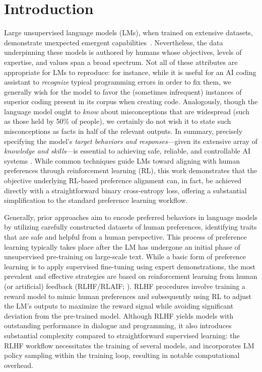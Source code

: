 \section{Introduction}
Large unsupervised language models (LMs), when trained on extensive datasets, demonstrate unexpected emergent capabilities~\citep{chowdhery2022palm, brown2020language, touvron2023llama,bubeck2023sparks}. Nevertheless, the data underpinning these models is authored by humans whose objectives, levels of expertise, and values span a broad spectrum. Not all of these attributes are appropriate for LMs to reproduce: for instance, while it is useful for an AI coding assistant to \textit{recognize} typical programming errors in order to fix them, we generally wish for the model to favor the (sometimes infrequent) instances of superior coding present in its corpus when creating code. Analogously, though the language model ought to \textit{know} about misconceptions that are widespread (such as those held by 50\% of people), we certainly do not wish it to state such misconceptions as facts in half of the relevant outputs. In summary, precisely specifying the model’s \emph{target behaviors and responses}—given its extensive array of \textit{knowledge and skills}—is essential to achieving safe, reliable, and controllable AI systems \citep{ouyang2022training}. While common techniques guide LMs toward aligning with human preferences through reinforcement learning (RL), this work demonstrates that the objective underlying RL-based preference alignment can, in fact, be achieved directly with a straightforward binary cross-entropy loss, offering a substantial simplification to the standard preference learning workflow.

Generally, prior approaches aim to encode preferred behaviors in language models by utilizing carefully constructed datasets of human preferences, identifying traits that are safe and helpful from a human perspective. This process of preference learning typically takes place after the LM has undergone an initial phase of unsupervised pre-training on large-scale text. While a basic form of preference learning is to apply supervised fine-tuning using expert demonstrations, the most prevalent and effective strategies are based on reinforcement learning from human (or artificial) feedback (RLHF/RLAIF; \citep{christiano2017deep,bai2022constitutional}). RLHF procedures involve training a reward model to mimic human preferences and subsequently using RL to adjust the LM's outputs to maximize the reward signal while avoiding significant deviation from the pre-trained model. Although RLHF yields models with outstanding performance in dialogue and programming, it also introduces substantial complexity compared to straightforward supervised learning: the RLHF workflow necessitates the training of several models, and incorporates LM policy sampling within the training loop, resulting in notable computational overhead.

